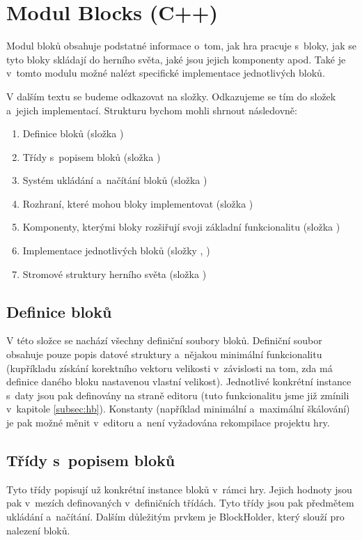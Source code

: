 
\section{Modul Blocks (C++)}



Modul bloků obsahuje podstatné informace o~tom, jak hra pracuje s~bloky, jak se tyto bloky skládají do herního světa, jaké jsou jejich komponenty apod. Také je v~tomto modulu možné nalézt specifické implementace jednotlivých bloků.

V dalším textu se budeme odkazovat na složky. Odkazujeme se tím do složek  a~jejich  implementací. Strukturu bychom mohli shrnout následovně:

\begin{enumerate}
	\item Definice bloků (složka )
	\item Třídy s~popisem bloků (složka )
	\item Systém ukládání a~načítání bloků (složka )
	\item Rozhraní, které mohou bloky implementovat (složka )
	\item Komponenty, kterými bloky rozšiřují svoji základní funkcionalitu (složka )
	\item Implementace jednotlivých bloků (složky , )
	\item Stromové struktury herního světa (složka )
\end{enumerate}
 

\subsection{Definice bloků}
V této složce se nachází všechny definiční soubory bloků. Definiční soubor obsahuje pouze popis datové struktury a~nějakou minimální funkcionalitu (kupříkladu získání korektního vektoru velikosti v~závislosti na tom, zda má definice daného bloku nastavenou vlastní velikost). Jednotlivé konkrétní instance s~daty jsou pak definovány na straně editoru (tuto funkcionalitu jsme již zmínili v~kapitole \ref{subsec:hb}). Konstanty (například minimální a~maximální škálování) je pak možné měnit v~editoru a~není vyžadována rekompilace projektu hry. 


\subsection{Třídy s~popisem bloků}
Tyto třídy popisují už konkrétní instance bloků v~rámci hry. Jejich hodnoty jsou pak v~mezích definovaných v~definičních třídách. Tyto třídy jsou pak předmětem ukládání a~načítání. Dalším důležitým prvkem je BlockHolder, který slouží pro nalezení bloků. 


